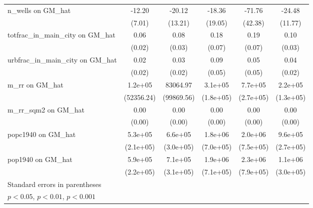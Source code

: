 {\begin{tabular}{l*{5}{c}}
\addlinespace
n\_wells on GM\_hat&   -12.20         &   -20.12         &   -18.36         &   -71.76         &   -24.48\sym{*}  \\
                &   (7.01)         &  (13.21)         &  (19.05)         &  (42.38)         &  (11.77)         \\
\addlinespace
totfrac\_in\_main\_city on GM\_hat&     0.06\sym{**} &     0.08\sym{**} &     0.18\sym{**} &     0.19\sym{**} &     0.10\sym{***}\\
                &   (0.02)         &   (0.03)         &   (0.07)         &   (0.07)         &   (0.03)         \\
\addlinespace
urbfrac\_in\_main\_city on GM\_hat&     0.02         &     0.03         &     0.09         &     0.05         &     0.04\sym{*}  \\
                &   (0.02)         &   (0.02)         &   (0.05)         &   (0.05)         &   (0.02)         \\
\addlinespace
m\_rr on GM\_hat  &  1.2e+05\sym{*}  & 83064.97         &  3.1e+05         &  7.7e+05\sym{**} &  2.2e+05         \\
                &(52356.24)         &(99869.56)         &(1.8e+05)         &(2.7e+05)         &(1.3e+05)         \\
\addlinespace
m\_rr\_sqm2 on GM\_hat&     0.00         &     0.00         &     0.00         &     0.00         &     0.00\sym{*}  \\
                &   (0.00)         &   (0.00)         &   (0.00)         &   (0.00)         &   (0.00)         \\
\addlinespace
popc1940 on GM\_hat&  5.3e+05\sym{*}  &  6.6e+05\sym{*}  &  1.8e+06\sym{*}  &  2.0e+06\sym{**} &  9.6e+05\sym{***}\\
                &(2.1e+05)         &(3.0e+05)         &(7.0e+05)         &(7.5e+05)         &(2.7e+05)         \\
\addlinespace
pop1940 on GM\_hat&  5.9e+05\sym{**} &  7.1e+05\sym{*}  &  1.9e+06\sym{**} &  2.3e+06\sym{**} &  1.1e+06\sym{***}\\
                &(2.2e+05)         &(3.1e+05)         &(7.1e+05)         &(7.9e+05)         &(3.0e+05)         \\
\bottomrule
\multicolumn{6}{l}{\footnotesize Standard errors in parentheses}\\
\multicolumn{6}{l}{\footnotesize \sym{*} \(p<0.05\), \sym{**} \(p<0.01\), \sym{***} \(p<0.001\)}\\
\end{tabular}
}
